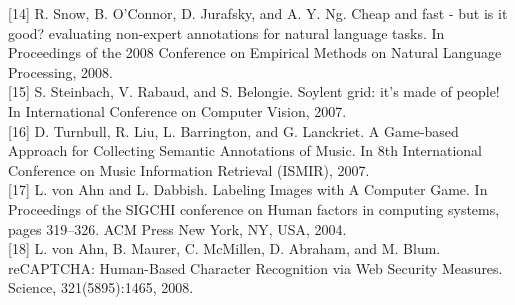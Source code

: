 \documentclass[
]{article}
\begin{document}
{[}14{]} R. Snow, B. O'Connor, D. Jurafsky, and A. Y. Ng. Cheap and fast
- but is it good? evaluating non-expert annotations for natural language
tasks. In Proceedings of the 2008 Conference on Empirical Methods on
Natural Language Processing, 2008.\\
{[}15{]} S. Steinbach, V. Rabaud, and S. Belongie. Soylent grid: it's
made of people! In International Conference on Computer Vision, 2007.\\
{[}16{]} D. Turnbull, R. Liu, L. Barrington, and G. Lanckriet. A
Game-based Approach for Collecting Semantic Annotations of Music. In 8th
International Conference on Music Information Retrieval (ISMIR), 2007.\\
{[}17{]} L. von Ahn and L. Dabbish. Labeling Images with A Computer
Game. In Proceedings of the SIGCHI conference on Human factors in
computing systems, pages 319--326. ACM Press New York, NY, USA, 2004.\\
{[}18{]} L. von Ahn, B. Maurer, C. McMillen, D. Abraham, and M. Blum.
reCAPTCHA: Human-Based Character Recognition via Web Security Measures.
Science, 321(5895):1465, 2008.
\end{document}
